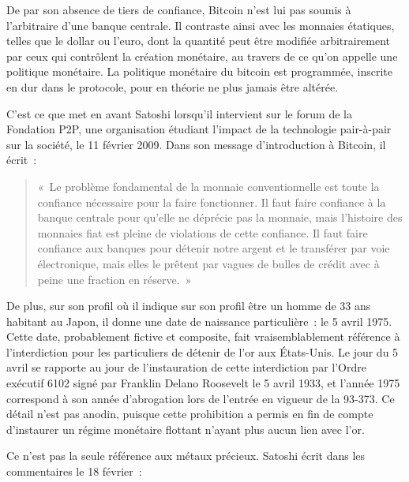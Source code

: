 De par son absence de tiers de confiance, Bitcoin n'est lui pas soumis à l'arbitraire d'une banque centrale. Il contraste ainsi avec les monnaies étatiques, telles que le dollar ou l'euro, dont la quantité peut être modifiée arbitrairement par ceux qui contrôlent la création monétaire, au travers de ce qu'on appelle une politique monétaire. La politique monétaire du bitcoin est programmée, inscrite en dur dans le protocole, pour en théorie ne plus jamais être altérée.

C'est ce que met en avant Satoshi lorsqu'il intervient sur le forum de la Fondation P2P, une organisation étudiant l'impact de la technologie pair-à-pair sur la société, le 11 février 2009. Dans son message d'introduction à Bitcoin, il écrit~:

\begin{quote}
«~Le problème fondamental de la monnaie conventionnelle est toute la confiance nécessaire pour la faire fonctionner. Il faut faire confiance à la banque centrale pour qu'elle ne déprécie pas la monnaie, mais l'histoire des monnaies fiat est pleine de violations de cette confiance. Il faut faire confiance aux banques pour détenir notre argent et le transférer par voie électronique, mais elles le prêtent par vagues de bulles de crédit avec à peine une fraction en réserve.~»
\end{quote}

De plus, sur son profil où il indique sur son profil être un homme de 33 ans habitant au Japon, il donne une date de naissance particulière~: le 5 avril 1975. Cette date, probablement fictive et composite, fait vraisemblablement référence à l'interdiction pour les particuliers de détenir de l'or aux États-Unis. Le jour du 5 avril se rapporte au jour de l'instauration de cette interdiction par l'Ordre exécutif 6102 signé par Franklin Delano Roosevelt le 5 avril 1933, et l'année 1975 correspond à son année d'abrogation lors de l'entrée en vigueur de la  93-373. Ce détail n'est pas anodin, puisque cette prohibition a permis en fin de compte d'instaurer un régime monétaire flottant n'ayant plus aucun lien avec l'or.

Ce n'est pas la seule référence aux métaux précieux. Satoshi écrit dans les commentaires le 18 février~:

